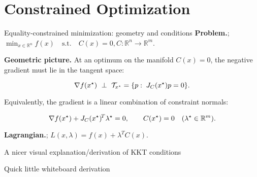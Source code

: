 
\section{Constrained Optimization}


\begin{frame}{Equality-constrained minimization: geometry and conditions}
\textbf{Problem.}; $\min_{x\in\mathbb{R}^n} f(x)\quad \text{s.t.}\quad C(x)=0, C:\mathbb{R}^n\to\mathbb{R}^m$.

\medskip
\textbf{Geometric picture.} At an optimum on the manifold $C(x)=0$, the negative gradient must lie in the tangent space:

$$
\grad f(x^\star)\ \perp\ \mathcal{T}_{x^\star}=\{p:\; J_C(x^\star)p=0\}.
$$

Equivalently, the gradient is a linear combination of constraint normals:

$$
\nabla f(x^\star)+J_C(x^\star)^{\!T}\lambda^\star=0,\qquad C(x^\star)=0\quad(\lambda^\star\in\mathbb{R}^m).
$$

\medskip
\textbf{Lagrangian.}; $L(x,\lambda)=f(x)+\lambda^{\!T}C(x)$.
\end{frame}

\begin{frame}{A nicer visual explanation/derivation of KKT conditions}
\begin{center}
    Quick little whiteboard derivation
\end{center}
    
\end{frame}





